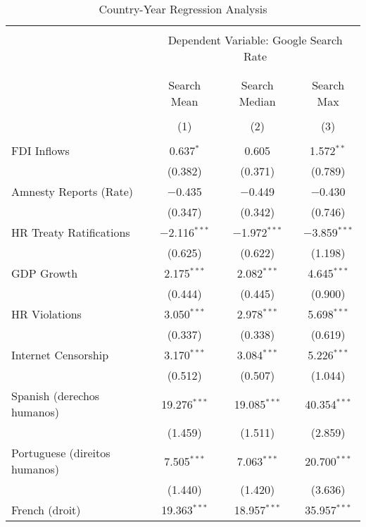 
\begin{table}[!htbp] \centering 
  \caption{Country-Year Regression Analysis} 
  \label{} 
\begin{tabular}{@{\extracolsep{5pt}}lccc} 
\\[-1.8ex]\hline 
\hline \\[-1.8ex] 
 & \multicolumn{3}{c}{Dependent Variable: Google Search Rate} \\ 
\cline{2-4} 
\\[-1.8ex] & \multicolumn{3}{c}{ } \\ 
 & Search Mean & Search Median & Search Max \\ 
\\[-1.8ex] & (1) & (2) & (3)\\ 
\hline \\[-1.8ex] 
 FDI Inflows & 0.637$^{*}$ & 0.605 & 1.572$^{**}$ \\ 
  & (0.382) & (0.371) & (0.789) \\ 
  Amnesty Reports (Rate) & $-$0.435 & $-$0.449 & $-$0.430 \\ 
  & (0.347) & (0.342) & (0.746) \\ 
  HR Treaty Ratifications & $-$2.116$^{***}$ & $-$1.972$^{***}$ & $-$3.859$^{***}$ \\ 
  & (0.625) & (0.622) & (1.198) \\ 
  GDP Growth & 2.175$^{***}$ & 2.082$^{***}$ & 4.645$^{***}$ \\ 
  & (0.444) & (0.445) & (0.900) \\ 
  HR Violations & 3.050$^{***}$ & 2.978$^{***}$ & 5.698$^{***}$ \\ 
  & (0.337) & (0.338) & (0.619) \\ 
  Internet Censorship & 3.170$^{***}$ & 3.084$^{***}$ & 5.226$^{***}$ \\ 
  & (0.512) & (0.507) & (1.044) \\ 
  Spanish (derechos humanos) & 19.276$^{***}$ & 19.085$^{***}$ & 40.354$^{***}$ \\ 
  & (1.459) & (1.511) & (2.859) \\ 
  Portuguese (direitos humanos) & 7.505$^{***}$ & 7.063$^{***}$ & 20.700$^{***}$ \\ 
  & (1.440) & (1.420) & (3.636) \\ 
  French (droit) & 19.363$^{***}$ & 18.957$^{***}$ & 35.957$^{***}$ \\ 

\end{tabular}
\end{table}

